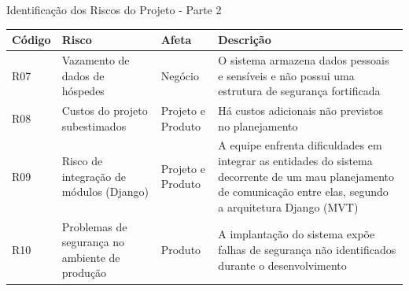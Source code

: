 \documentclass[
	12pt,				%
	openany,			%
	oneside,			%
	a4paper,			%
	english,			%
	french,				%
	spanish,			%
	brazil				%
	]{abntex2}
\begin{document}
%
\begin{quadro} [H]
	\caption{Identificação dos Riscos do Projeto - Parte 2} \label{identificacao_riscos_2} 
	\begin{tabular}{|>{\centering\arraybackslash}p{2cm}|>{\centering\arraybackslash}p{5cm}|>{\centering\arraybackslash}p{3cm}|p{4.2cm}|}
		\hline
		\textbf{Código} & \textbf{Risco} & \textbf{Afeta} & \textbf{Descrição}  \\
		\hline			
		R07 & Vazamento de dados de hóspedes & Negócio & O sistema  armazena dados pessoais e sensíveis e não possui uma estrutura de segurança fortificada \\
		\hline
		R08 & Custos do projeto subestimados & Projeto e Produto & Há custos adicionais não previstos no planejamento \\
		\hline
		R09 & Risco de integração de módulos (Django) & Projeto e Produto & A equipe enfrenta dificuldades em integrar as entidades do sistema decorrente de um mau planejamento de comunicação entre elas, segundo a arquitetura Django (MVT) \\
		\hline
		R10 & Problemas de segurança no ambiente de produção & Produto & A implantação do sistema expõe falhas de segurança não identificados durante o desenvolvimento \\
		\hline
	\end{tabular}
\end{quadro}				
\end{document}
